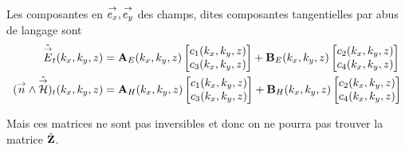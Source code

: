   Les composantes en \({\overset{\rightarrow}{e_x}},{\overset{\rightarrow}{e_y}}\) des champs, dites composantes tangentielles par abus de langage sont
  \begin{align*}
      \hat{{\overset{\rightarrow}{E}}}_t(k_x,k_y,z) &= \mathbf{A}_E(k_x,k_y,z) \begin{bmatrix}c_1(k_x,k_y,z) \\ c_3(k_x,k_y,z)\end{bmatrix} + \mathbf{B}_E(k_x,k_y,z) \begin{bmatrix}c_2(k_x,k_y,z) \\ c_4(k_x,k_y,z)\end{bmatrix}
      \\
      ({\overset{\rightarrow}{n}} \wedge \hat{{\overset{\rightarrow}{\mathcal{H}}}})_t(k_x,k_y,z) &= \mathbf{A}_H(k_x,k_y,z) \begin{bmatrix}c_1(k_x,k_y,z) \\ c_3(k_x,k_y,z)\end{bmatrix} + \mathbf{B}_H(k_x,k_y,z) \begin{bmatrix}c_2(k_x,k_y,z) \\ c_4(k_x,k_y,z)\end{bmatrix}
  \end{align*}

  Mais ces matrices ne sont pas inversibles et donc on ne pourra pas trouver la matrice \(\hat{\mathbf{Z}}\).